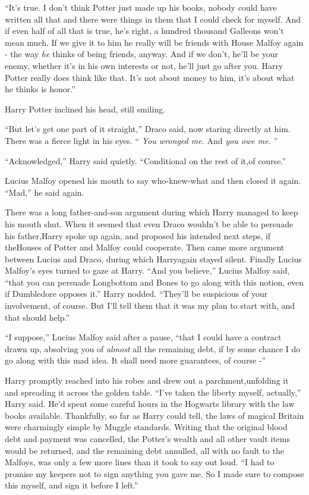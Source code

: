 ``It's true. I don't think Potter just made up his books, nobody could have written all that and there were things in them that I could check for myself. And if even half of all that is true, he's right, a hundred thousand Galleons won't mean much. If we give it to him he really will be friends with House Malfoy again - the way \emph{he} thinks of being friends, anyway. And if we don't, he'll be your enemy, whether it's in his own interests or not, he'll just go after you. Harry Potter really does think like that. It's not about money to him, it's about what he thinks is honor.''

Harry Potter inclined his head, still smiling.

``But let's get one part of it straight,'' Draco said, now staring directly at him. There was a fierce light in his eyes. `` \emph{You wronged me.} And \emph{you owe me.} ''

``Acknowledged,'' Harry said quietly. ``Conditional on the rest of it,of course.''

Lucius Malfoy opened his mouth to say who-knew-what and then closed it again. ``Mad,'' he said again.

There was a long father-and-son argument during which Harry managed to keep his mouth shut.
When it seemed that even Draco wouldn't be able to persuade his father,Harry spoke up again, and proposed his intended next steps, if theHouses of Potter and Malfoy could cooperate.
Then came more argument between Lucius and Draco, during which Harryagain stayed silent.
Finally Lucius Malfoy's eyes turned to gaze at Harry. ``And you believe,'' Lucius Malfoy said, ``that you can persuade Longbottom and Bones to go along with this notion, even if Dumbledore opposes it.''
Harry nodded. ``They'll be suspicious of your involvement, of course. But I'll tell them that it was my plan to start with, and that should help.''

``I suppose,'' Lucius Malfoy said after a pause, ``that I could have a contract drawn up, absolving you of \emph{almost} all the remaining debt, if by some chance I do go along with this mad idea. It shall need more guarantees, of course -''

Harry promptly reached into his robes and drew out a parchment,unfolding it and spreading it across the golden table. ``I've taken the liberty myself, actually,'' Harry said. He'd spent some careful hours in the Hogwarts library with the law books available. Thankfully, so far as Harry could tell, the laws of magical Britain were charmingly simple by Muggle standards. Writing that the original blood debt and payment was cancelled, the Potter's wealth and all other vault items would be returned, and the remaining debt annulled, all with no fault to the Malfoys, was only a few more lines than it took to say out loud. ``I had to promise my keepers not to sign anything you gave me. So I made sure to compose this myself, and sign it before I left.''

